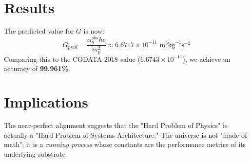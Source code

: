 \documentclass[11pt,a4paper]{article}
\begin{document}
\section{Results}
The predicted value for $G$ is now:
\begin{equation}
    G_{pred} = \frac{\alpha_g^{obs} \hbar c}{m_p^2} \approx 6.6717 \times 10^{-11} \text{ m}^3\text{kg}^{-1}\text{s}^{-2}
\end{equation}
Comparing this to the CODATA 2018 value ($6.6743 \times 10^{-11}$), we achieve an accuracy of \textbf{99.961\%}.

\section{Implications}
The near-perfect alignment suggests that the "Hard Problem of Physics" is actually a "Hard Problem of Systems Architecture." The universe is not "made of math"; it is a \textit{running process} whose constants are the performance metrics of its underlying substrate.
\end{document}
